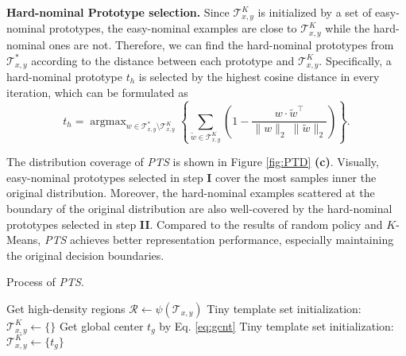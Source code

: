 \documentclass[default,iicol]{sn-jnl}\usepackage[algo2e,ruled,linesnumbered]{algorithm2e}
\theoremstyle{thmstyleone}\newtheorem{theorem}{Theorem}\newtheorem{proposition}[theorem]{Proposition}
\theoremstyle{thmstyletwo}\newtheorem{example}{Example}\newtheorem{remark}{Remark}
\theoremstyle{thmstylethree}\newtheorem{definition}{Definition}
\begin{document}
\noindent\textbf{Hard-nominal Prototype selection. }
Since $\mathcal{T}^{K}_{x, y}$ is initialized by a set of easy-nominal prototypes, the easy-nominal examples are close to $\mathcal{T}^{K}_{x, y}$ while the hard-nominal ones are not.
Therefore, we can find the hard-nominal prototypes from $\mathcal{T}^{*}_{x,y}$ according to the distance between each prototype and $\mathcal{T}^{K}_{x, y}$.
Specifically, a hard-nominal prototype $t_{h}$ is selected by the highest cosine distance in every iteration, which can be formulated as
\begin{equation}
    t_{h} = \!\!\mathop{\arg\max}_{w\in\mathcal{T}^{*}_{x,y}\setminus\mathcal{T}^{K}_{x,y}}\!\left\{\sum_{\tilde{w}\in\mathcal{T}^{K}_{x,y}}\!\left(1-\frac{w\cdot\tilde{w}^{\top}}{\|w\|_{2}\ \|\tilde{w}\|_{2}}\right)\!\right\}.
    \label{eq:hard} 
\end{equation}

The distribution coverage of \textit{PTS} is shown in Figure \ref{fig:PTD} \textbf{(c)}.
Visually, easy-nominal prototypes selected in step \textbf{I} cover the most samples inner the original distribution.
Moreover, the hard-nominal examples scattered at the boundary of the original distribution are also well-covered by the hard-nominal prototypes selected in step \textbf{II}.
Compared to the results of random policy and $K$-Means, \textit{PTS} achieves better representation performance, especially maintaining the original decision boundaries.

\begin{algorithm2e}[!t]
    \footnotesize
\caption{Process of \textit{PTS}.}
    \label{alg:PTS}
    Get high-density regions $\mathcal{R}\leftarrow\psi(\mathcal{T}_{x,y})$\;
     {
        Tiny template set initialization: $\mathcal{T}^{K}_{x,y}\leftarrow \{\}$\;
    }   {
        Get global center $t_{g}$ by Eq. \ref{eq:gcnt}\;
        Tiny template set initialization: $\mathcal{T}^{K}_{x,y}\leftarrow \{t_{g}\}$\;
    }
\end{algorithm2e}
\end{document}
